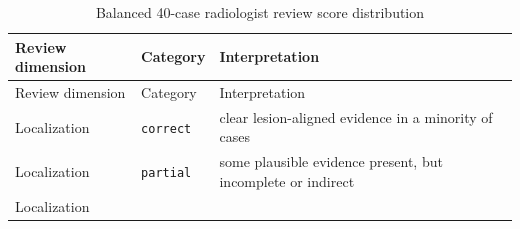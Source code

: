 \begin{longtable}[]{@{}lll@{}}
	\caption{Balanced 40-case radiologist review score
		distribution}\tabularnewline
	\toprule
	\begin{minipage}[b]{0.20\columnwidth}\raggedright
		Review dimension\strut
	\end{minipage} & \begin{minipage}[b]{0.20\columnwidth}\raggedright
		Category\strut
	\end{minipage} & \begin{minipage}[b]{0.40\columnwidth}\raggedright
		Interpretation\strut
	\end{minipage}\tabularnewline
	\midrule
	\endfirsthead
	\toprule
	\begin{minipage}[b]{0.20\columnwidth}\raggedright
		Review dimension\strut
	\end{minipage} & \begin{minipage}[b]{0.20\columnwidth}\raggedright
		Category\strut
	\end{minipage} & \begin{minipage}[b]{0.40\columnwidth}\raggedright
		Interpretation\strut
	\end{minipage}\tabularnewline
	\midrule
	\endhead
	\begin{minipage}[t]{0.20\columnwidth}\raggedright
		Localization\strut
	\end{minipage} & \begin{minipage}[t]{0.20\columnwidth}\raggedright
		\texttt{correct}\strut
	\end{minipage} & \begin{minipage}[t]{0.40\columnwidth}\raggedright
		clear lesion-aligned evidence in a minority of cases\strut
	\end{minipage}\tabularnewline
	\begin{minipage}[t]{0.20\columnwidth}\raggedright
		Localization\strut
	\end{minipage} & \begin{minipage}[t]{0.20\columnwidth}\raggedright
		\texttt{partial}\strut
	\end{minipage} & \begin{minipage}[t]{0.40\columnwidth}\raggedright
		some plausible evidence present, but incomplete or indirect\strut
	\end{minipage}\tabularnewline
	\begin{minipage}[t]{0.20\columnwidth}\raggedright
		Localization\strut
	\end{minipage} & \begin{minipage}[t]{0.20\columnwidth}\raggedright

\end{minipage}
\end{longtable}
